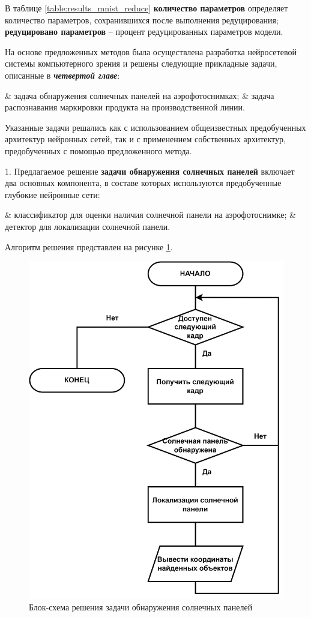 \documentclass{thesisby}
\begin{document}
В таблице \ref{table:results_mnist_reduce} \textbf{количество параметров} определяет количество параметров, сохранившихся после выполнения редуцирования; \textbf{редуцировано параметров} -- процент редуцированных параметров модели.

На основе предложенных методов была осуществлена разработка нейросетевой системы компьютерного зрения и решены следующие прикладные задачи, описанные в \textit{\textbf{четвертой главе}}:
\begin{easylistNum}
    & задача обнаружения солнечных панелей на аэрофотоснимках;
    & задача распознавания маркировки продукта на производственной линии.
\end{easylistNum}
Указанные задачи решались как с использованием общеизвестных предобученных архитектур нейронных сетей, так и с применением собственных архитектур, предобученных с помощью предложенного метода.

1. Предлагаемое решение \textbf{задачи обнаружения солнечных панелей} включает два основных компонента, в составе которых используются предобученные глубокие нейронные сети: 

\begin{easylistNum}
    & классификатор для оценки наличия солнечной панели на аэрофотоснимке;
    & детектор для локализации солнечной панели.
\end{easylistNum}

Алгоритм решения представлен на рисунке \ref{fig:solar_system_arch}.

\begin{figure}[ht]
	\centering
	\includegraphics[width=12cm]{man-source/images/ch4/pic4-16a.png}
	\caption{Блок-схема решения задачи обнаружения солнечных панелей}
	\label{fig:solar_system_arch}
\end{figure}
\end{document}
